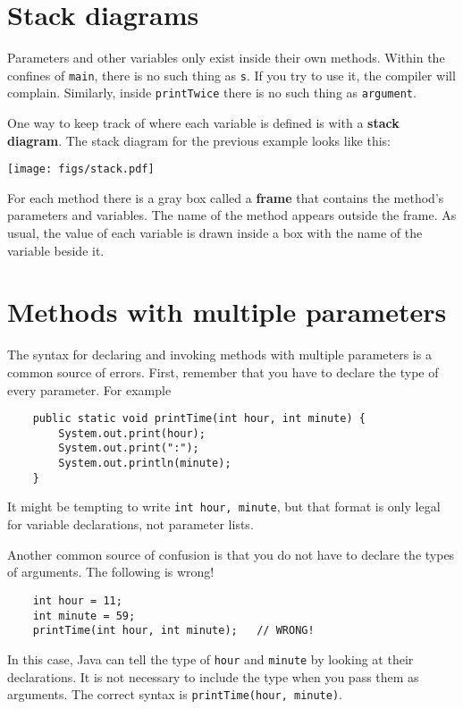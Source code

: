 \documentclass[12pt]{book}
\theoremstyle{definition}
\begin{document}
\section {Stack diagrams}
\label{stack}

Parameters and other
variables only exist inside their own methods.  Within the
confines of {\tt main}, there is no such thing as {\tt s}.
If you try to use it, the compiler will complain.  Similarly,
inside {\tt printTwice} there is no such thing as {\tt argument}.

One way to keep track of where each variable is defined is
with a {\bf stack diagram}.  The stack diagram for the previous
example looks like this:

\texttt{[image: figs/stack.pdf]}

For each method there is a gray box called a {\bf frame} that contains
the method's parameters and variables.  The name of the method
appears outside the frame.  As usual, the value of each variable
is drawn inside a box with the name of the variable beside it.



\section {Methods with multiple parameters}
\label{time}

The syntax for declaring and invoking methods with multiple
parameters is a common source of errors.  First, remember
that you have to declare the type of every parameter.  For
example

\begin{lstlisting}
    public static void printTime(int hour, int minute) {
        System.out.print(hour);
        System.out.print(":");
        System.out.println(minute);
    }
\end{lstlisting}
%
It might be tempting to write {\tt int hour, minute}, but
that format is only legal for variable declarations, not
parameter lists.

Another common source of confusion is that you do not have
to declare the types of arguments.  The following is wrong!

\begin{lstlisting}
    int hour = 11;
    int minute = 59;
    printTime(int hour, int minute);   // WRONG!
\end{lstlisting}
%
In this case, Java can tell the type of {\tt hour}
and {\tt minute} by looking at their declarations.  It is
not necessary to include the type when you pass them
as arguments.  The correct
syntax is {\tt printTime(hour, minute)}.
\end{document}
